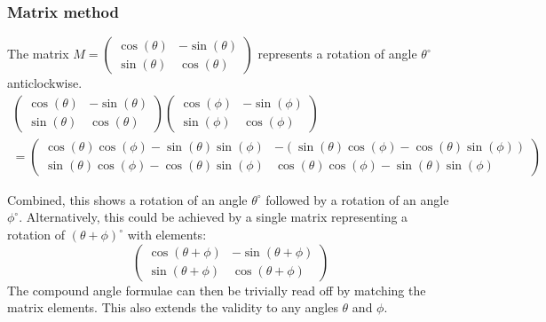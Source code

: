 \documentclass[11pt, a4paper]{article}
\begin{document}
\subsubsection*{Matrix method}
The matrix $M=\begin{pmatrix} \cos(\theta) & -\sin(\theta) \\ \sin(\theta) & \cos(\theta) \end{pmatrix}$ represents a rotation of angle $\theta^{\circ}$ anticlockwise.
\begin{multline*}
\begin{pmatrix} \cos(\theta) & -\sin(\theta) \\ \sin(\theta) & \cos(\theta) \end{pmatrix} \begin{pmatrix} \cos(\phi) & -\sin(\phi) \\ \sin(\phi) & \cos(\phi) \end{pmatrix} \\ =\begin{pmatrix} \cos(\theta)\cos(\phi)-\sin(\theta)\sin(\phi) & -\left( \sin(\theta)\cos(\phi)-\cos(\theta)\sin(\phi) \right) \\ \sin(\theta)\cos(\phi)-\cos(\theta)\sin(\phi) & \cos(\theta)\cos(\phi)-\sin(\theta)\sin(\phi) \end{pmatrix}
\end{multline*}

Combined, this shows a rotation of an angle $\theta^{\circ}$ followed by a rotation of an angle $\phi^{\circ}$. Alternatively, this could be achieved by a single matrix representing a rotation of $(\theta+\phi)^{\circ}$ with elements:
\begin{equation*}
\begin{pmatrix} \cos(\theta+\phi) & -\sin(\theta+\phi) \\ \sin(\theta+\phi) & \cos(\theta+\phi) \end{pmatrix}
\end{equation*}
The compound angle formulae can then be trivially read off by matching the matrix elements. This also extends the validity to any angles $\theta$ and $\phi$.
\vspace{0.5cm}
\end{document}
